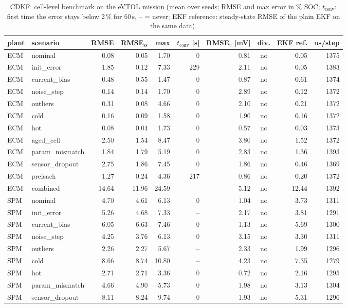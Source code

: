 \begin{table}[H]\centering\footnotesize\setlength{\tabcolsep}{4pt}
\caption{CDKF: cell-level benchmark on the eVTOL mission (mean over seeds; RMSE and max error in \% SOC; $t_\mathrm{conv}$: first time the error stays below 2\,\% for 60\,s, -- = never; EKF reference: steady-state RMSE of the plain EKF on the same data).}\label{tab:cell_CDKF}
\begin{tabular}{llrrrrrcrr}\toprule
plant & scenario & RMSE & RMSE$_\mathrm{ss}$ & max & $t_\mathrm{conv}$ [s] & RMSE$_v$ [mV] & div. & EKF ref. & ns/step \\ \midrule
ECM & nominal & 0.08 & 0.05 & 1.70 & 0 & 0.81 & no & 0.05 & 1375 \\
ECM & init\_error & 1.85 & 0.12 & 7.33 & 229 & 2.11 & no & 0.05 & 1383 \\
ECM & current\_bias & 0.48 & 0.55 & 1.47 & 0 & 0.87 & no & 0.61 & 1374 \\
ECM & noise\_step & 0.14 & 0.14 & 1.70 & 0 & 2.89 & no & 0.12 & 1372 \\
ECM & outliers & 0.31 & 0.08 & 4.66 & 0 & 2.10 & no & 0.21 & 1372 \\
ECM & cold & 0.16 & 0.09 & 1.58 & 0 & 1.90 & no & 0.16 & 1372 \\
ECM & hot & 0.08 & 0.04 & 1.73 & 0 & 0.57 & no & 0.03 & 1373 \\
ECM & aged\_cell & 2.50 & 1.54 & 8.47 & 0 & 3.80 & no & 1.52 & 1372 \\
ECM & param\_mismatch & 1.84 & 1.79 & 5.19 & 0 & 2.83 & no & 1.36 & 1393 \\
ECM & sensor\_dropout & 2.75 & 1.86 & 7.45 & 0 & 1.86 & no & 0.46 & 1369 \\
ECM & preisach & 1.27 & 0.24 & 4.36 & 217 & 0.86 & no & 0.20 & 1372 \\
ECM & combined & 14.64 & 11.96 & 24.59 & -- & 5.12 & no & 12.44 & 1392 \\
\midrule
SPM & nominal & 4.70 & 4.61 & 6.13 & 0 & 1.04 & no & 3.73 & 1311 \\
SPM & init\_error & 5.26 & 4.68 & 7.33 & -- & 2.17 & no & 3.81 & 1291 \\
SPM & current\_bias & 6.05 & 6.63 & 7.46 & 0 & 1.13 & no & 5.69 & 1300 \\
SPM & noise\_step & 4.25 & 3.76 & 6.13 & 0 & 3.15 & no & 3.30 & 1311 \\
SPM & outliers & 2.26 & 2.27 & 5.67 & -- & 2.33 & no & 1.99 & 1296 \\
SPM & cold & 8.66 & 8.74 & 10.80 & -- & 4.23 & no & 7.35 & 1279 \\
SPM & hot & 2.71 & 2.71 & 3.36 & 0 & 0.72 & no & 2.16 & 1295 \\
SPM & param\_mismatch & 4.66 & 4.90 & 5.73 & 0 & 1.98 & no & 3.13 & 1304 \\
SPM & sensor\_dropout & 8.11 & 8.24 & 9.74 & 0 & 1.93 & no & 5.31 & 1296 \\
\bottomrule\end{tabular}\end{table}
